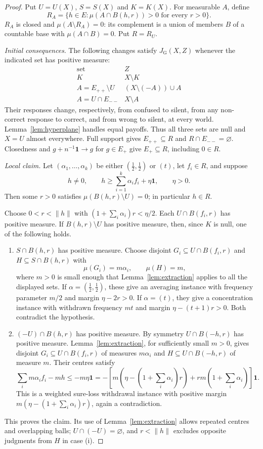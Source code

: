 \documentclass[11pt]{article}
\theoremstyle{definition}
\newcommand{\one}{\mathbf 1}
\newcommand{\GU}{\mathrm{G}}
\begin{document}
\begin{proof}
Put $U=U(X)$, $S=S(X)$ and $K=K(X)$. For measurable $A$, define
\[
R_A=\{h\in E:\mu(A\cap B(h,r))>0\text{ for every }r>0\}.
\]
$R_A$ is closed and $\mu(A\setminus R_A)=0$: its complement is a union of members $B$ of a countable base with $\mu(A\cap B)=0$. Put $R=R_U$.

\emph{Initial consequences.} The following changes satisfy $J_\GU(X,Z)$ whenever the indicated set has positive measure:
\[
\begin{array}{c|c}
\text{set}&Z\\\hline
K&X\setminus K\\
A=E_{++}\setminus U&(X\setminus(-A))\cup A\\
A=U\cap E_{--}&X\setminus A
\end{array}
\]
Their responses change, respectively, from confused to silent, from any non-correct response to correct, and from wrong to silent, at every world. Lemma~\ref{lem:hyperplane} handles equal payoffs. Thus all three sets are null and $X=U$ almost everywhere. Full support gives $E_{++}\subseteq R$ and $R\cap E_{--}=\varnothing$. Closedness and $g+n^{-1}\one\to g$ for $g\in E_+$ give $E_+\subseteq R$, including $0\in R$.

\emph{Local claim.} Let $(\alpha_1,\ldots,\alpha_k)$ be either $(\tfrac12,\tfrac12)$ or $(t)$, let $f_i\in R$, and suppose
\[
h\ne0,\qquad h\ge\sum_{i=1}^k\alpha_if_i+\eta\one,\qquad\eta>0.
\]
Then some $r>0$ satisfies $\mu(B(h,r)\setminus U)=0$; in particular $h\in R$.

Choose $0<r<\|h\|$ with $(1+\sum_i\alpha_i)r<\eta/2$. Each $U\cap B(f_i,r)$ has positive measure. If $B(h,r)\setminus U$ has positive measure, then, since $K$ is null, one of the following holds.
\begin{enumerate}[label=(\roman*)]
\item $S\cap B(h,r)$ has positive measure. Choose disjoint $G_i\subseteq U\cap B(f_i,r)$ and $H\subseteq S\cap B(h,r)$ with
\[
\mu(G_i)=m\alpha_i,\qquad \mu(H)=m,
\]
where $m>0$ is small enough that Lemma~\ref{lem:extraction} applies to all the displayed sets. If $\alpha=(\tfrac12,\tfrac12)$, these give an averaging instance with frequency parameter $m/2$ and margin $\eta-2r>0$. If $\alpha=(t)$, they give a concentration instance with withdrawn frequency $mt$ and margin $\eta-(t+1)r>0$. Both contradict the hypothesis.
\item $(-U)\cap B(h,r)$ has positive measure. By symmetry $U\cap B(-h,r)$ has positive measure. Lemma~\ref{lem:extraction}, for sufficiently small $m>0$, gives disjoint $G_i\subseteq U\cap B(f_i,r)$ of measures $m\alpha_i$ and $H\subseteq U\cap B(-h,r)$ of measure $m$. Their centres satisfy
\[
\sum_i m\alpha_i f_i-mh\le-m\eta\one
=-\left[m\left(\eta-(1+\sum_i\alpha_i)r\right)
       +rm(1+\sum_i\alpha_i)\right]\one.
\]
This is a weighted sure-loss withdrawal instance with positive margin $m(\eta-(1+\sum_i\alpha_i)r)$, again a contradiction.
\end{enumerate}
This proves the claim. Its use of Lemma~\ref{lem:extraction} allows repeated centres and overlapping balls; $U\cap(-U)=\varnothing$, and $r<\|h\|$ excludes opposite judgments from $H$ in case (i).


\end{proof}
\end{document}
